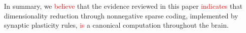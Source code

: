 
In summary, we \textcolor{red} {believe} that the evidence reviewed in this paper \textcolor{red} {indicates} that dimensionality reduction through nonnegative sparse coding, implemented by synaptic plasticity rules, \textcolor{red} {is} a canonical computation throughout the brain.





